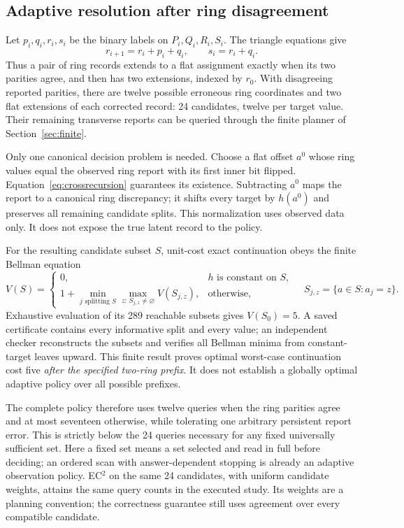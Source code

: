 \documentclass[11pt,a4paper]{article}
\theoremstyle{definition}\newtheorem{definition}[theorem]{Definition}
\begin{document}
\subsection{Adaptive resolution after ring disagreement}\label{sec:ringcontinuation}
Let $p_i,q_i,r_i,s_i$ be the binary labels on $P_i,Q_i,R_i,S_i$. The triangle equations give
\begin{equation}
 r_{i+1}=r_i+p_i+q_i,\qquad s_i=r_i+q_i.
 \label{eq:crossrecursion}
\end{equation}
Thus a pair of ring records extends to a flat assignment exactly when its two parities agree, and then has two extensions, indexed by $r_0$. With disagreeing reported parities, there are twelve possible erroneous ring coordinates and two flat extensions of each corrected record: 24 candidates, twelve per target value. Their remaining transverse reports can be queried through the finite planner of Section~\ref{sec:finite}.

Only one canonical decision problem is needed. Choose a flat offset $a^0$ whose ring values equal the observed ring report with its first inner bit flipped. Equation~\eqref{eq:crossrecursion} guarantees its existence. Subtracting $a^0$ maps the report to a canonical ring discrepancy; it shifts every target by $h(a^0)$ and preserves all remaining candidate splits. This normalization uses observed data only. It does not expose the true latent record to the policy.

For the resulting candidate subset $S$, unit-cost exact continuation obeys the finite Bellman equation
\begin{equation}
 V(S)=\begin{cases}
 0,&h\text{ is constant on }S,\\
 1+\displaystyle\min_{j\text{ splitting }S}\max_{z:\,S_{j,z}\ne\varnothing}V(S_{j,z}),&\text{otherwise},
 \end{cases}
 \quad S_{j,z}=\{a\in S:a_j=z\}.
 \label{eq:ringbellman}
\end{equation}
Exhaustive evaluation of its 289 reachable subsets gives $V(S_0)=5$. A saved certificate contains every informative split and every value; an independent checker reconstructs the subsets and verifies all Bellman minima from constant-target leaves upward. This finite result proves optimal worst-case continuation cost five \emph{after the specified two-ring prefix}. It does not establish a globally optimal adaptive policy over all possible prefixes.

The complete policy therefore uses twelve queries when the ring parities agree and at most seventeen otherwise, while tolerating one arbitrary persistent report error. This is strictly below the 24 queries necessary for any fixed universally sufficient set. Here a fixed set means a set selected and read in full before deciding; an ordered scan with answer-dependent stopping is already an adaptive observation policy. EC$^2$ on the same 24 candidates, with uniform candidate weights, attains the same query counts in the executed study. Its weights are a planning convention; the correctness guarantee still uses agreement over every compatible candidate.
\end{document}
